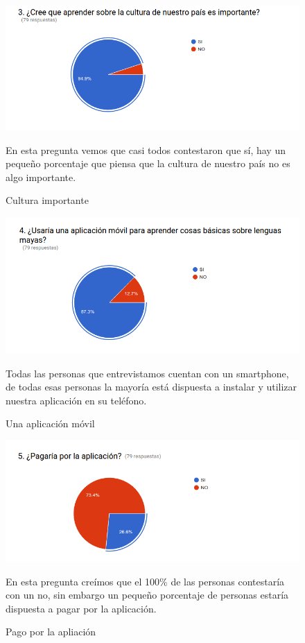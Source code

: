 \documentclass[a4paper,openright,11pt]{article}
\begin{document}
\begin{figure}
	\includegraphics[width=1.0\textwidth]{e3}
	\caption{Cultura importante}
	\label{fig:e3}
	En esta pregunta vemos que casi todos contestaron que sí, hay un pequeño porcentaje que piensa que la cultura de nuestro país no es algo importante.
\end{figure}
\begin{figure}
	\includegraphics[width=1.0\textwidth]{e4}
	\caption{Una aplicación móvil}
	\label{fig:e4}
	Todas las personas que entrevistamos cuentan con un smartphone, de todas esas personas la mayoría está dispuesta a instalar y utilizar nuestra aplicación en su teléfono.
\end{figure}
\begin{figure}
	\includegraphics[width=1.0\textwidth]{e5}
	\caption{Pago por la apliación}
	\label{fig:e5}
	En esta pregunta creímos que el 100\% de las personas contestaría con un no, sin embargo un pequeño porcentaje de personas estaría dispuesta a pagar por la aplicación.
\end{figure}
\end{document}
